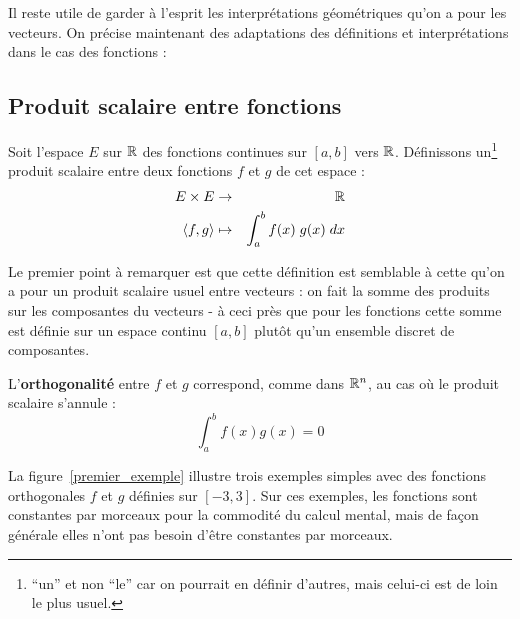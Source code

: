 Il reste utile de garder à l'esprit les interprétations géométriques qu'on a pour les vecteurs. On précise maintenant des adaptations des définitions et interprétations dans le cas des fonctions :

\subsection{Produit scalaire entre fonctions}
\label{sec:prodscal}

Soit l'espace $E$ sur $\mathbb{R}$ des fonctions continues sur
$[a,b]$ vers $\mathbb{R}$. Définissons un\footnote{``un'' et non ``le'' car
on pourrait en définir d'autres, mais celui-ci est de loin le plus usuel.} produit scalaire entre deux fonctions $f$ et $g$ de cet espace :
\begin{eqnarray}
E \times E & \rightarrow & \mathbb{R} \nonumber \\
\langle f, g \rangle & \mapsto & \int_a^b f(x)\; g(x)\; dx
\end{eqnarray}

Le premier point à remarquer est que cette définition est semblable à cette qu'on a pour un produit scalaire usuel entre vecteurs : on fait la somme des produits sur les composantes du vecteurs - à ceci près que pour les fonctions cette somme est définie sur un espace continu  $[a,b]$ plutôt qu'un ensemble discret de composantes.

L'\textbf{orthogonalité} entre $f$ et $g$ correspond, comme dans $\mathbb{R}^n$,
au cas où le produit scalaire s'annule :
\begin{equation}
\int_a^b f(x)g(x)=0
\end{equation}


La figure~\ref{premier_exemple} illustre trois exemples simples avec des fonctions orthogonales $f$ et $g$ définies sur $[-3,3]$. Sur ces exemples, les fonctions sont constantes par morceaux pour la commodité du calcul mental, mais de façon générale elles n'ont pas besoin d'être constantes par morceaux.

